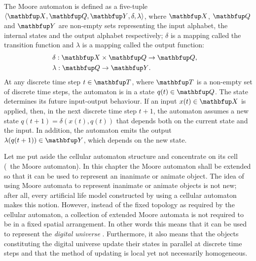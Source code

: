 \begin{definition}
\label{def:Moore}
The Moore automaton is defined as a five-tuple $\langle\set{X},\set{Q},\set{Y},\delta,\lambda\rangle$, where $\set{X}$, $\set{Q}$ and $\set{Y}$ are non-empty sets representing the input alphabet, the internal states and the output alphabet respectively; $\delta$ is a mapping called the transition function and $\lambda$ is a mapping called the output function:
\begin{eqnarray}
& \delta: \set{X}\times \set{Q}\rightarrow \set{Q}, & \\
& \lambda: \set{Q}\rightarrow \set{Y}. &
\end{eqnarray}
At any discrete time step $t \in \set{T}$, where $\set{T}$ is a non-empty set of discrete time steps, the automaton is in a state $q(t) \in \set{Q}$. The state determines its future input-output behaviour. If an input $x(t) \in \set{X}$ is applied, then, in the next discrete time step $t+1$, the automaton assumes a new state $q(t+1) = \delta(x(t),q(t))$ that depends both on the current state and the input. In addition, the automaton emits the output $\lambda(q(t+1)) \in \set{Y}$, which depends on the new state.
\end{definition}

Let me put aside the cellular automaton structure and concentrate on its cell (\ie\ the Moore automaton). In this chapter the Moore automaton shall be extended so that it can be used to represent an inanimate or animate object. The idea of using Moore automata to represent inanimate or animate objects is not new; after all, every artificial life model constructed by using a cellular automaton makes this notion. However, instead of the fixed topology as required by the cellular automaton, a collection of extended Moore automata is not required to be in a fixed spatial arrangement. In other words this means that it can be used to represent the \emph{digital universe} \cite{bentley:2002}. Furthermore, it also means that the objects constituting the digital universe update their states in parallel at discrete time steps and that the method of updating is local yet not necessarily homogeneous. 


